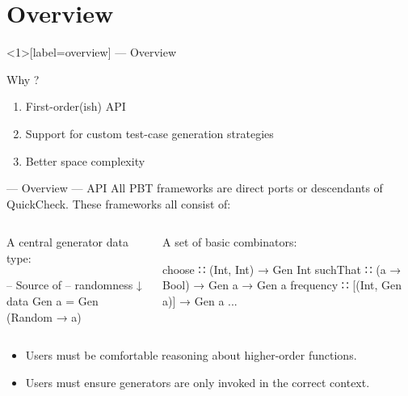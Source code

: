 \section{Overview}

\begin{frame}<1>[label=overview]{\halcheck{} --- Overview }
  \begin{block}{Why \halcheck?}
    \begin{enumerate}
      \item<alert@1> First-order(ish) API
      \item<alert@2> Support for custom test-case generation strategies
      \item<alert@3> Better space complexity
    \end{enumerate}
  \end{block}
\end{frame}

\begin{frame}[fragile]{\halcheck{} --- Overview --- API}
  All PBT frameworks are direct ports or descendants of QuickCheck. These frameworks all consist of:

  \bigskip{}
  \pause{}

  \begin{columns}[T,onlytextwidth]
    \begin{column}{0.47\textwidth}
      \begin{block}{A central generator data type:}
        \begin{haskellcode}
          --     Source of
          --     randomness ↓
          data Gen a = Gen (Random → a)
        \end{haskellcode}
      \end{block}
    \end{column}

    \pause{}

    \begin{column}{0.53\textwidth}
      \begin{block}{A set of basic combinators:}
        \begin{haskellcode}
          choose    ∷ (Int, Int) → Gen Int
          suchThat  ∷ (a → Bool) → Gen a → Gen a
          frequency ∷ [(Int, Gen a)] → Gen a
          ...
        \end{haskellcode}
      \end{block}
    \end{column}
  \end{columns}

  \pause{}

  \bigskip{}

  \begin{itemize}
    \item Users must be comfortable reasoning about higher-order functions.
    \item Users must ensure generators are only invoked in the \alert{correct context}.
  \end{itemize}
\end{frame}

